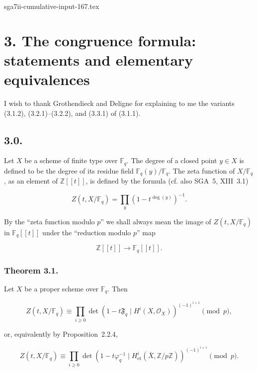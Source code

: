 \begin{filecontents*}{sga7ii-cumulative-input-167.tex}
\section*{3. The congruence formula: statements and elementary equivalences}

I wish to thank Grothendieck and Deligne for explaining to me the variants
(3.1.2), (3.2.1)--(3.2.2), and (3.3.1) of (3.1.1).

\subsection*{3.0.}
Let $X$ be a scheme of finite type over $\mathbb F_q$. The degree of a closed
point $y\in X$ is defined to be the degree of its residue field
$\mathbb F_q(y)/\mathbb F_q$. The zeta function of $X/\mathbb F_q$, as an
element of $\mathbb Z[[t]]$, is defined by the formula (cf. also SGA~5,
XIII~3.1)

\begin{equation}\tag{3.0.1}
Z(t,X/\mathbb F_q)=\prod_y(1-t^{\deg(y)})^{-1}.
\end{equation}

By the ``zeta function modulo $p$'' we shall always mean the image of
$Z(t,X/\mathbb F_q)$ in $\mathbb F_q[[t]]$ under the ``reduction modulo $p$''
map

\[
\mathbb Z[[t]]\longrightarrow\mathbb F_q[[t]].
\]

\subsubsection*{Theorem 3.1.}
Let $X$ be a proper scheme over $\mathbb F_q$. Then

\begin{equation}\tag{3.1.1}
Z(t,X/\mathbb F_q)
\equiv
\prod_{i\geq0}
\det\!\left(1-t\mathfrak F_q\mid H^i(X,\mathcal O_X)\right)^{(-1)^{i+1}}
\pmod p,
\end{equation}

or, equivalently by Proposition~2.2.4,

\begin{equation}\tag{3.1.2}
Z(t,X/\mathbb F_q)
\equiv
\prod_{i\geq0}
\det\!\left(1-t\varphi_q^{-1}\mid
H^i_{\mathrm{et}}(\bar X,\mathbb Z/p\mathbb Z)\right)^{(-1)^{i+1}}
\pmod p.
\end{equation}


\end{filecontents*}
